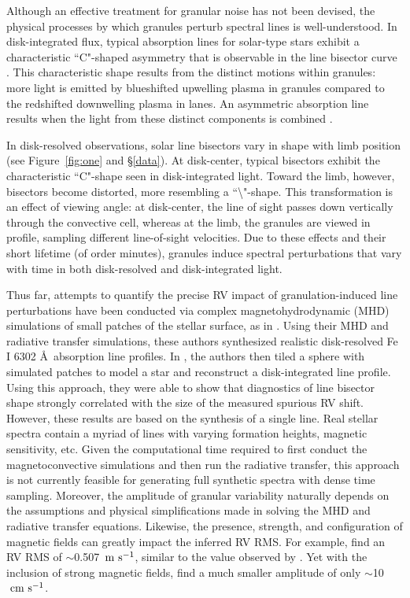 \documentclass[twocolumn]{aastex63}
\newcommand{\ms}{{\rm m\ s}^{-1}}
\newcommand{\cms}{\ {\rm cm\ s}^{-1}}
\newcommand{\revise}[1]{#1}
\begin{document}
Although an effective treatment for granular noise has not been devised, the physical processes by which granules perturb spectral lines is well-understood. In disk-integrated flux, typical absorption lines for solar-type stars exhibit a characteristic ``C"-shaped asymmetry that is observable in the line bisector curve \citep{Stathopoulou1993}. This characteristic shape results from the distinct motions within granules: more light is emitted by blueshifted upwelling plasma in granules compared to the redshifted downwelling plasma in lanes. An asymmetric absorption line results when the light from these distinct components is combined \citep{Gray2008}.

In disk-resolved observations, solar line bisectors vary in shape with limb position (see Figure~\ref{fig:one} and \S\ref{data}). At disk-center, typical bisectors exhibit the characteristic ``C"-shape seen in disk-integrated light. Toward the limb, however, bisectors become distorted, more resembling a ``\textbackslash"-shape. This transformation is an effect of viewing angle: at disk-center, the line of sight passes down vertically through the convective cell, whereas at the limb, the granules are viewed in profile, sampling different line-of-sight velocities. Due to these effects and their short lifetime (of order minutes), granules induce spectral perturbations that vary with time in both disk-resolved and disk-integrated light. \par 

Thus far, attempts to quantify the precise RV impact of granulation-induced line perturbations have been conducted via complex magnetohydrodynamic (MHD) simulations of small patches of the stellar surface, as in \citet{Cegla2018, Cegla2019a}. Using their MHD \citep[from][]{Vogler2005} and radiative transfer \citep[from][]{Socas-Navarro2015} simulations, these authors synthesized realistic disk-resolved Fe \textsc{I} 6302 \AA\ absorption line profiles. In \citet{Cegla2019a}, the authors then tiled a sphere with simulated patches to model a star and reconstruct a disk-integrated line profile. Using this approach, they were able to show that diagnostics of line bisector shape strongly correlated with the size of the measured spurious RV shift. However, these results are based on the synthesis of a single line. Real stellar spectra contain a myriad of lines with varying formation heights, magnetic sensitivity, etc. Given the computational time required to first conduct the magnetoconvective simulations and then run the radiative transfer, this approach is not \revise{currently} feasible for generating full synthetic spectra with dense time sampling. \revise{Moreover, the amplitude of granular variability naturally depends on the assumptions and physical simplifications made in solving the MHD and radiative transfer equations. Likewise, the presence, strength, and configuration of magnetic fields can greatly impact the inferred RV RMS. For example, \citet{Sulis2020} find an RV RMS of $\sim$0.507\ $\ms$, similar to the value observed by \citet{Palle1999}. Yet with the inclusion of strong magnetic fields, \citet{Cegla2019a} find a much smaller amplitude of only $\sim$10$\cms$.} \par  
\end{document}
